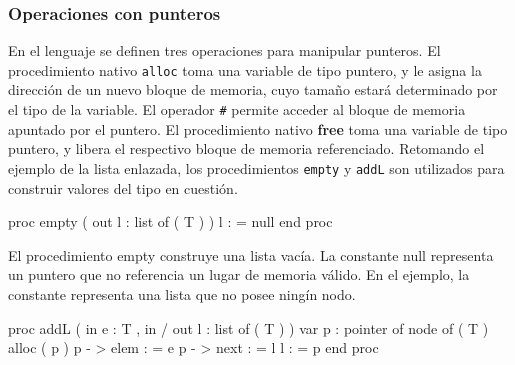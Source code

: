 \subsubsection{Operaciones con punteros}
En el lenguaje se definen tres operaciones para manipular punteros. El procedimiento nativo \texttt{alloc} toma una variable de tipo puntero, y le asigna la dirección de un nuevo bloque de memoria, cuyo tamaño estará determinado por el tipo de la variable. El operador \texttt{\#} permite acceder al bloque de memoria apuntado por el puntero. El procedimiento nativo \textbf{free} toma una variable de tipo puntero, y libera el respectivo bloque de memoria referenciado.
\newline Retomando el ejemplo de la lista enlazada, los procedimientos \texttt{empty} y \texttt{addL} son utilizados para construir valores del tipo en cuestión.

\begin{pascallike}
proc empty ( out l : list of ( T ) )
    l : = null
end proc
\end{pascallike}

El procedimiento empty construye una lista vacía. La constante null representa un puntero que no referencia un lugar de memoria válido. En el ejemplo, la constante representa una lista que no posee ningín nodo.

\begin{pascallike}
proc addL ( in e : T , in / out l : list of ( T ) )
    var p : pointer of node of ( T )
    alloc ( p )
    p - > elem : = e
    p - > next : = l
    l : = p
end proc
\end{pascallike}